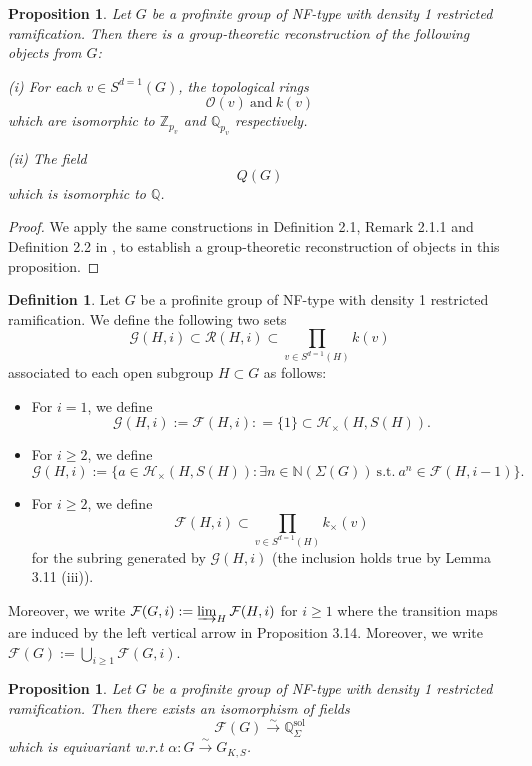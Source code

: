 \documentclass{article}
\theoremstyle{plain}
\newtheorem{prop}[thm]{Proposition}
\theoremstyle{definition}
\newtheorem{defn}[thm]{Definition}
\theoremstyle{remark}
\begin{document}
\begin{prop}
Let $G$ be a profinite group of NF-type with density 1 restricted ramification. Then there is a group-theoretic reconstruction of the following objects from $G$: \par 
(i) For each $v \in S^{d=1}(G)$, the topological rings
$$
\mathcal{O}(v) ~\text{and}~k(v)
$$
which are isomorphic to $\mathbb Z_{p_v}$ and $\mathbb Q_{p_v}$ respectively. \par 
(ii) The field
$$
Q(G)
$$
which is isomorphic to $\mathbb Q$.
\end{prop}
\begin{proof}
We apply the same constructions in Definition 2.1, Remark 2.1.1 and Definition 2.2 in \cite{Ho2}, to establish a group-theoretic reconstruction of objects in this proposition. 
\end{proof}
\begin{defn}
Let $G$ be a profinite group of NF-type with density 1 restricted ramification. We define the following two sets
$$
\mathcal{G}(H,i) \subset \mathcal{R}(H,i) \subset \prod_{v \in S^{d=1}(H)} k(v)
$$
associated to each open subgroup $H \subset G$ as follows:
\begin{itemize}
    \item For $i = 1$, we define
    $$
    \mathcal{G}(H,i) := \mathcal{F}(H,i) : =\{1\} \subset \mathcal{H}_{\times}(H,S(H)).
    $$
    \item For $i \geq 2$, we define
    $$
    \mathcal{G}(H,i) := \{a \in \mathcal{H}_{\times}(H,S(H)): \exists n \in \mathbb{N}(\Sigma(G))~\text{s.t.}~a^n \in \mathcal{F}(H,i-1)\}. 
    $$
    \item For $ i \geq 2$, we define
    $$
    \mathcal{F}(H,i) \subset \prod_{v \in S^{d=1}(H)} k_{\times}(v)
    $$
    for the subring generated by $\mathcal{G}(H,i)$ (the inclusion holds true by Lemma 3.11 (iii)).
\end{itemize}
Moreover, we write $\mathcal{F}(G,i) := \varinjlim_H \mathcal{F}(H,i)$ for $i \geq 1$ where the transition maps are induced by the left vertical arrow in Proposition 3.14. Moreover, we write $\mathcal{F}(G) := \bigcup_{i \geq 1} \mathcal{F}(G,i)$.
\end{defn}
\begin{prop}
Let $G$ be a profinite group of NF-type with density 1 restricted ramification. Then there exists an isomorphism of fields
$$
\mathcal{F}(G) \xrightarrow{\sim} \mathbb Q^{\text{sol}}_{\Sigma}
$$
which is equivariant w.r.t $\alpha: G \xrightarrow{\sim} G_{K,S}$.
\end{prop}
\end{document}
